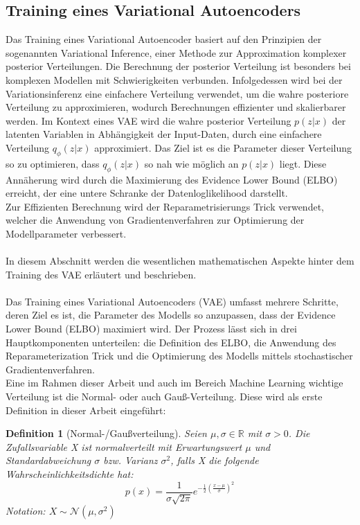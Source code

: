 \documentclass[%
thesis=student,%
coverpage=false,%
titlepage=false,%
headmarks=true, %
german,%
font=libertine, %
math=newpxtx, %
BCOR=5mm,%
coverBCOR=11mm%
]{tumbook}
\theoremstyle{break}
\newtheorem{definition}{Definition}[section]
\begin{document}
\subsection{Training eines Variational Autoencoders}
Das Training eines Variational Autoencoder basiert auf den Prinzipien der sogenannten Variational Inference, einer Methode zur Approximation komplexer posterior Verteilungen. Die Berechnung der posterior Verteilung ist besonders bei komplexen Modellen mit Schwierigkeiten verbunden. Infolgedessen wird bei der Variationsinferenz eine einfachere Verteilung verwendet, um die wahre posteriore Verteilung zu approximieren, wodurch Berechnungen effizienter und skalierbarer werden.
Im Kontext eines VAE wird die wahre posterior Verteilung $p(z|x)$ der latenten Variablen in Abhängigkeit der Input-Daten, durch eine einfachere Verteilung $q_\phi(z|x)$ approximiert. Das Ziel ist es die Parameter dieser Verteilung so zu optimieren, dass $q_\phi(z|x)$ so nah wie möglich an $p(z|x)$ liegt. Diese Annäherung wird durch die Maximierung des Evidence Lower Bound (ELBO) erreicht, der eine untere Schranke der Datenloglikelihood darstellt. \\
Zur Effizienten Berechnung wird der Reparametrisierungs Trick verwendet, welcher die Anwendung von Gradientenverfahren zur Optimierung der Modellparameter verbessert.\\
\\
In diesem Abschnitt werden die wesentlichen mathematischen Aspekte hinter dem Training des VAE erläutert und beschrieben.\\
\\
Das Training eines Variational Autoencoders (VAE) umfasst mehrere Schritte, deren Ziel es ist, die Parameter des Modells so anzupassen, dass der Evidence Lower Bound (ELBO) maximiert wird. Der Prozess lässt sich in drei Hauptkomponenten unterteilen: die Definition des ELBO, die Anwendung des Reparameterization Trick und die Optimierung des Modells mittels stochastischer Gradientenverfahren.\\
Eine im Rahmen dieser Arbeit und auch im Bereich Machine Learning wichtige Verteilung ist die Normal- oder auch Gauß-Verteilung. Diese wird als erste Definition in dieser Arbeit eingeführt:
\begin{definition}[Normal-/Gaußverteilung]
	Seien $\mu, \sigma \in \mathbb{R}$ mit $\sigma > 0$.
	Die Zufallsvariable X ist normalverteilt mit Erwartungswert $\mu$ und Standardabweichung $\sigma$ bzw. Varianz $\sigma^2$, falls X die folgende Wahrscheinlichkeitsdichte hat: 
	$$ p(x) = \frac{1}{\sigma \sqrt{2\pi}} e^{-\frac{1}{2}(\frac{x-\mu}{\sigma})^2}$$
	Notation: $X \sim \mathcal{N}(\mu, \sigma^2)$
	\label{def:Normalverteilung}
\end{definition}\noindent
\end{document}
